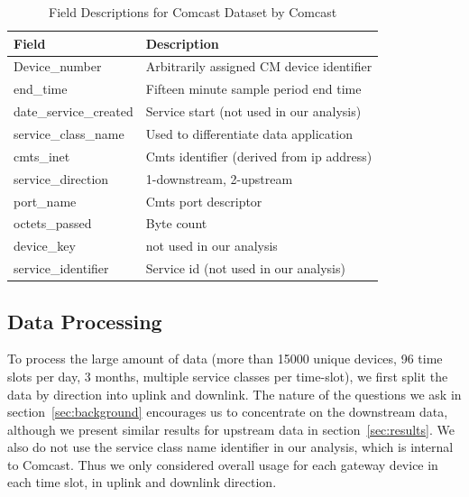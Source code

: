 \begin{table}[ht]
\small
\begin{tabular}{|l|l|}
\hline
\textbf{Field}         & \textbf{Description}                      \\ \hline
Device\_number         & Arbitrarily assigned CM device identifier \\ \hline
end\_time              & Fifteen minute sample period end time     \\ \hline
date\_service\_created & Service start (not used in our analysis)  \\ \hline
service\_class\_name   & Used to differentiate data application    \\ \hline
cmts\_inet             & Cmts identifier (derived from ip address) \\ \hline
service\_direction     & 1-downstream, 2-upstream                  \\ \hline
port\_name             & Cmts port descriptor                      \\ \hline
octets\_passed         & Byte count                                \\ \hline
device\_key            & not used in our analysis                  \\ \hline
service\_identifier    & Service id (not used in our analysis)     \\ \hline
\end{tabular}
\caption{Field Descriptions for Comcast Dataset by Comcast}
\label{tab:field-description}
\end{table}

\subsection{Data Processing}

To process the large amount of data (more than 15000 unique devices, 96 time slots per day, 3 months, multiple service classes per time-slot), we first split the data by direction into uplink and downlink. The nature of the questions we ask in section~\ref{sec:background} encourages us to concentrate on the downstream data, although we present similar results for upstream data in section~\ref{sec:results}. We also do not use the service class name identifier in our analysis, which is internal to Comcast.  Thus we only considered overall usage for each gateway device in each time slot, in uplink and downlink direction.

